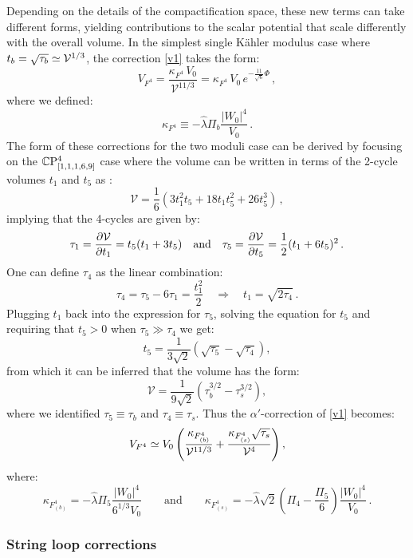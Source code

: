 \documentclass[11pt,a4paper]{article}
\newcommand{\be}{\begin{equation}}
\newcommand{\ee}{\end{equation}}
\newcommand\vo{{\mathcal{V}}}
\newcommand{\V}{{\cal{V}}}
\begin{document}
Depending on the details of the compactification space, these new terms can take different forms, yielding contributions to the scalar potential that scale differently with the overall volume. In the simplest single K\"ahler modulus case where $t_b = \sqrt{\tau_b} \simeq \V^{1/3}$, the correction \eqref{v1} takes the form:
\be
V_{F^4} =  \frac{\kappa_{F^4}\,V_0}{\vo^{11/3}} = \kappa_{F^4}\, V_0\,e^{-\frac{11}{\sqrt{6}} \Phi}\,,
\label{VF4}
\ee
where we defined:
\be
\kappa_{F^4} \equiv - \hat{\lambda}  \Pi_b \frac{|W_0|^4}{V_0}\,.
\ee
The form of these corrections for the two moduli case can be derived by focusing on the $\mathbb{C} \rm{P}^4_{[1,1,1,6,9]}$ case where the volume can be written in terms of the 2-cycle volumes $t_1$ and $t_5$ as \cite{Denef:2004dm}:
\be
\vo = \frac{1}{6} (3 t_1^2 t_5 + 18 t_1 t_5^2 + 26 t_5^3)\,,
\ee
implying that the 4-cycles are given by:
\be
\tau_1 = \frac{\partial \V}{\partial t_1} = t_5 (t_1 + 3 t_5) \quad\text{and}\quad \tau_5 = \frac{\partial \V}{\partial t_5} = \frac{1}{2} (t_1 + 6 t_5)^2\,.
\ee
One can define $\tau_4$ as the linear combination:
\be
\tau_4 = \tau_5 - 6 \tau_1 = \frac{t_1^2}{2} \quad \Rightarrow \quad t_1 = \sqrt{2 \tau_4}\,.
\ee
Plugging $t_1$ back into the expression for $\tau_5$, solving the equation for $t_5$ and requiring that $t_5 > 0$ when $\tau_5 \gg \tau_4$ we get:
\be
t_5 = \frac{1}{3 \sqrt{2}} \left(\sqrt{\tau_5} - \sqrt{\tau_4}\right),
\ee
from which it can be inferred that the volume has the form:
\be
\vo = \frac{1}{9 \sqrt{2}} \left(\tau_b^{3/2} - \tau_s^{3/2}\right),
\ee
where we identified $\tau_5 \equiv \tau_b$ and $\tau_4 \equiv \tau_s$. Thus the $\alpha'$-correction of \eqref{v1} becomes:
\be
V_{F^4} \simeq V_0 \left(\frac{\kappa_{F^4_{(b)}}}{\vo^{11/3}} + \frac{\kappa_{F^4_{(s)}} \sqrt{\tau_s}}{\V^4}\right),
\label{deltav1}
\ee
where:
\be
\kappa_{F^4_{(b)}} = - \hat\lambda  \Pi_5 \frac{|W_0|^4}{6^{1/3} V_0} \qquad\text{and}\qquad \kappa_{F^4_{(s)}} = -\hat\lambda \sqrt{2} \left(\Pi_4 - \frac{\Pi_5}{6}\right) \frac{|W_0|^4}{V_0} \,.
\ee

\subsubsection{String loop corrections}
\end{document}
